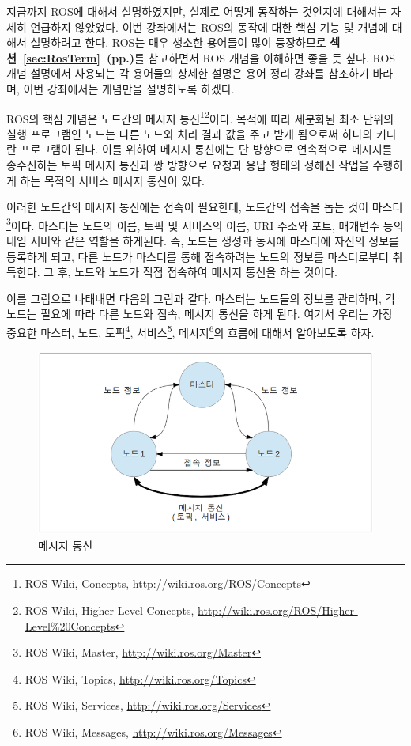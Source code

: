 지금까지 ROS에 대해서 설명하였지만, 실제로 어떻게 동작하는 것인지에 대해서는 자세히 언급하지 않았었다. 이번 강좌에서는 ROS의 동작에 대한 핵심 기능 및 개념에 대해서 설명하려고 한다. ROS는 매우 생소한 용어들이 많이 등장하므로 \textbf{섹션~\ref{sec:RosTerm}~(pp.\pageref{sec:RosTerm})}를 참고하면서 ROS 개념을 이해하면 좋을 듯 싶다. ROS 개념 설명에서 사용되는 각 용어들의 상세한 설명은 용어 정리 강좌를 참조하기 바라며, 이번 강좌에서는 개념만을 설명하도록 하겠다.

ROS의 핵심 개념은 노드간의 메시지 통신\footnote{ROS Wiki, Concepts, \url{http://wiki.ros.org/ROS/Concepts}}\footnote{ROS Wiki, Higher-Level Concepts, \url{http://wiki.ros.org/ROS/Higher-Level\%20Concepts}}이다. 목적에 따라 세분화된 최소 단위의 실행 프로그램인 노드는 다른 노드와 처리 결과 값을 주고 받게 됨으로써 하나의 커다란 프로그램이 된다. 이를 위하여 메시지 통신에는 단 방향으로 연속적으로 메시지를 송수신하는 토픽 메시지 통신과 쌍 방향으로 요청과 응답 형태의 정해진 작업을 수행하게 하는 목적의 서비스 메시지 통신이 있다. 

이러한 노드간의 메시지 통신에는 접속이 필요한데, 노드간의 접속을 돕는 것이 마스터\footnote{ROS Wiki, Master, \url{http://wiki.ros.org/Master}}이다. 마스터는 노드의 이름, 토픽 및 서비스의 이름, URI 주소와 포트, 매개변수 등의 네임 서버와 같은 역할을 하게된다. 즉, 노드는 생성과 동시에 마스터에 자신의 정보를 등록하게 되고, 다른 노드가 마스터를 통해 접속하려는 노드의 정보를 마스터로부터 취득한다. 그 후, 노드와 노드가 직접 접속하여 메시지 통신을 하는 것이다. 

이를 그림으로 나태내면 다음의 그림과 같다. 마스터는 노드들의 정보를 관리하며, 각 노드는 필요에 따라 다른 노드와 접속, 메시지 통신을 하게 된다. 여기서 우리는 가장 중요한 마스터, 노드, 토픽\footnote{ROS Wiki, Topics, \url{http://wiki.ros.org/Topics}}, 서비스\footnote{ROS Wiki, Services, \url{http://wiki.ros.org/Services}}, 메시지\footnote{ROS Wiki, Messages, \url{http://wiki.ros.org/Messages}}의 흐름에 대해서 알아보도록 하자.

\begin{figure}[h]
\centering\includegraphics[width=0.6\columnwidth]{pictures/chapter4/message_communication.png}
\caption{메시지 통신}
\end{figure}


